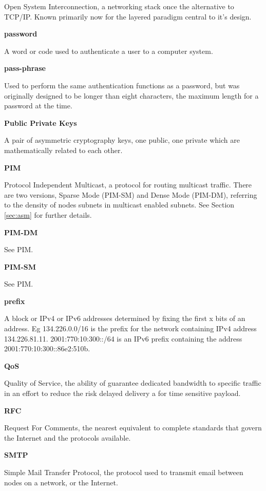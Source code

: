 Open System Interconnection, a networking stack once the alternative to
TCP/IP. Known primarily now for the layered paradigm central to it's
design.

\textbf{password}

A word or code used to authenticate a user to a computer system.

\textbf{pass-phrase}

Used to perform the same authentication functions as a password, but was
originally designed to be longer than eight characters, the maximum
length for a password at the time.

\textbf{Public Private Keys}

A pair of asymmetric cryptography keys, one public, one private which 
are mathematically related to each other. 

\textbf{PIM}

Protocol Independent Multicast, a protocol for routing multicast
traffic. There are two versions, Sparse Mode (PIM-SM) and Dense Mode
(PIM-DM), referring to the density of nodes subnets in multicast 
enabled subnets. See Section \ref{sec:asm} for further details.

\textbf{PIM-DM}

See PIM.

\textbf{PIM-SM}

See PIM.

\textbf{prefix}

A block or IPv4 or IPv6 addresses determined by fixing the first x bits
of an address. Eg 134.226.0.0/16 is the prefix for the network
containing IPv4 address 134.226.81.11. 2001:770:10:300::/64 is an IPv6
prefix containing the address 2001:770:10:300::86e2:510b. 

\textbf{QoS}

Quality of Service, the ability of guarantee dedicated bandwidth to
specific traffic in an effort to reduce the risk delayed delivery a for
time sensitive payload.

\textbf{RFC}

Request For Comments, the nearest equivalent to complete standards that
govern the Internet and the protocols available.

\textbf{SMTP}

Simple Mail Transfer Protocol, the protocol used to transmit email
between nodes on a network, or the Internet.


